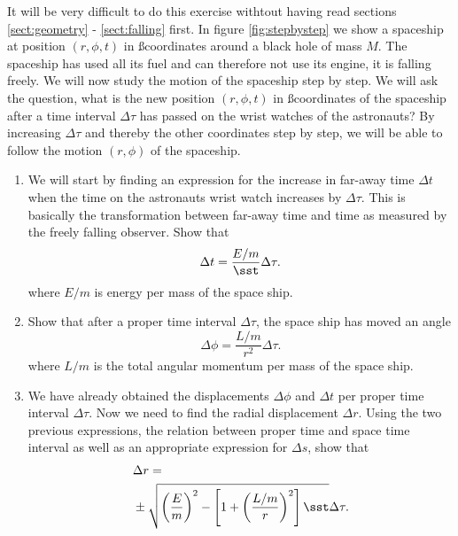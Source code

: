 {\begin{multicols}{2}
It will be very difficult to do this exercise withtout having read sections \ref{sect:geometry} - \ref{sect:falling} first.
In figure \ref{fig:stepbystep} we show a spaceship at position $(r,\phi,t)$ in \ss coordinates around a black hole of mass $M$. The spaceship has used all its fuel and can therefore not use its engine, it is falling freely.  We will now study the motion of the spaceship step by step. We will ask the question, what is the new position $(r,\phi,t)$ in \ss coordinates of the spaceship after a time interval $\Delta\tau$ has passed on the wrist watches of the astronauts? By increasing $\Delta\tau$ and thereby the other coordinates step by step, we will be able to follow the motion $(r,\phi)$ of the spaceship.
\begin{enumerate}
\item We will start by finding an expression for the increase in far-away time $\Delta t$ when the time on the astronauts wrist watch increases by $\Delta\tau$. This is basically the transformation between far-away time and time as measured by the freely falling observer. Show that
\[
\Delta t=\frac{E/m}{\sst}\Delta\tau.
\]
where $E/m$ is energy per mass of the space ship.
\item Show that after a proper time interval $\Delta\tau$, the space ship has moved an angle
\[
\Delta\phi=\frac{L/m}{r^2}\Delta\tau.
\]
where $L/m$ is the total angular momentum per mass of the space ship.
\item We have already obtained the displacements $\Delta\phi$ and $\Delta t$ per proper time interval $\Delta\tau$. Now we need to find the radial displacement $\Delta r$. Using the two previous expressions, the relation between proper time and space time interval as well as an appropriate expression for $\Delta s$, show that
\begin{align*}
&\Delta r=\\
&\pm\sqrt{\left(\frac{E}{m}\right)^2-\left[1+\left(\frac{L/m}{r}\right)^2\right]\sst}\Delta\tau.
\end{align*}
\end{enumerate}



\end{multicols}}
